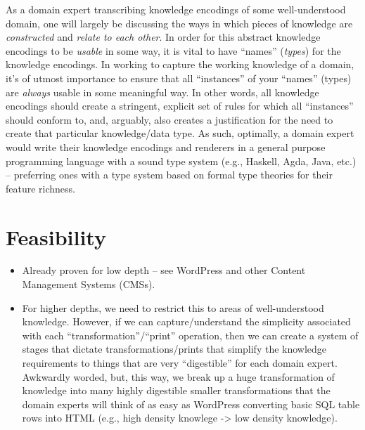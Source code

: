 As a domain expert transcribing knowledge encodings of some well-understood
domain, one will largely be discussing the ways in which pieces of knowledge are
\textit{constructed} and \textit{relate to each other}. In order for this
abstract knowledge encodings to be \textit{usable} in some way, it is vital to
have ``names'' (\textit{types}) for the knowledge encodings. In working to
capture the working knowledge of a domain, it's of utmost importance to ensure
that all ``instances'' of your ``names'' (types) are \textit{always} usable in
some meaningful way. In other words, all knowledge encodings should create a
stringent, explicit set of rules for which all ``instances'' should conform to,
and, arguably, also creates a justification for the need to create that
particular knowledge/data type. As such, optimally, a domain expert would write
their knowledge encodings and renderers in a general purpose programming
language with a sound type system (e.g., Haskell, Agda, Java, etc.) --
preferring ones with a type system based on formal type theories for their
feature richness.

\section{Feasibility}
\label{sec:idlgy:feasibility}

\begin{itemize}

    \item Already proven for low depth -- see WordPress and other
          Content Management Systems (CMSs).

    \item For higher depths, we need to restrict this to areas of
          well-understood knowledge. However, if we can capture/understand the
          simplicity associated with each  ``transformation''/``print''
          operation, then we can create a system of stages that dictate
          transformations/prints that simplify the knowledge requirements to
          things that are very ``digestible'' for each domain expert. Awkwardly
          worded, but, this way, we break up a huge transformation of knowledge
          into many highly digestible smaller transformations that the domain
          experts will think of as easy as WordPress converting basic SQL table
          rows into HTML (e.g., high density knowlege -> low density knowledge).

\end{itemize}
